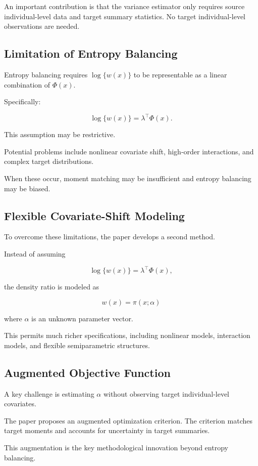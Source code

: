 \documentclass[11pt]{article}
\begin{document}
An important contribution is that the variance estimator only requires source individual-level data and target summary statistics. No target individual-level observations are needed.

\subsection*{Limitation of Entropy Balancing}

Entropy balancing requires $\log\{w(x)\}$ to be representable as a linear combination of $\Phi(x)$.

Specifically:

\[\log\{w(x)\}=\lambda^\top\Phi(x).\]

This assumption may be restrictive.

Potential problems include nonlinear covariate shift, high-order interactions, and complex target distributions.

When these occur, moment matching may be insufficient and entropy balancing may be biased.

\subsection*{Flexible Covariate-Shift Modeling}

To overcome these limitations, the paper develops a second method.

Instead of assuming

\[\log\{w(x)\}=\lambda^\top\Phi(x),\]

the density ratio is modeled as

\[w(x)=\pi(x;\alpha)\]

where $\alpha$ is an unknown parameter vector.

This permits much richer specifications, including nonlinear models, interaction models, and flexible semiparametric structures.

\subsection*{Augmented Objective Function}

A key challenge is estimating $\alpha$ without observing target individual-level covariates.

The paper proposes an augmented optimization criterion. The criterion matches target moments and accounts for uncertainty in target summaries.

This augmentation is the key methodological innovation beyond entropy balancing.
\end{document}
